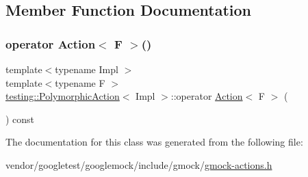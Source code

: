 \subsection{Member Function Documentation}
\mbox{\label{classtesting_1_1_polymorphic_action_ac35461616cc15c06f1a2f9ee1c03fb8f}} 
\subsubsection{\texorpdfstring{operator Action$<$ F $>$()}{operator Action< F >()}}
{\footnotesize\ttfamily template$<$typename Impl $>$ \\
template$<$typename F $>$ \\
\hyperlink{classtesting_1_1_polymorphic_action}{testing\+::\+Polymorphic\+Action}$<$ Impl $>$\+::operator \hyperlink{classtesting_1_1_action}{Action}$<$ F $>$ (\begin{DoxyParamCaption}{ }\end{DoxyParamCaption}) const\hspace{0.3cm}{\ttfamily [inline]}}



The documentation for this class was generated from the following file\+:\begin{DoxyCompactItemize}
\item 
vendor/googletest/googlemock/include/gmock/\hyperlink{gmock-actions_8h}{gmock-\/actions.\+h}\end{DoxyCompactItemize}

